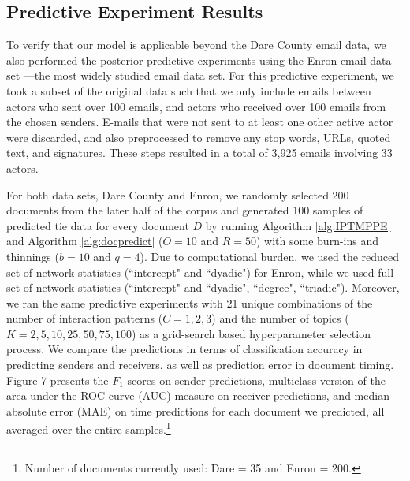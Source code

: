 \subsection{Predictive Experiment Results}
To verify that our model is applicable beyond the Dare County email data, we also performed the posterior predictive experiments using the Enron email data set ---the most widely studied email data set. For this predictive experiment, we took a subset of the original data such that we only include emails between actors who sent over 100 emails, and actors who received over 100 emails from the chosen senders. E-mails that were not sent to at least one other active actor were discarded, and also preprocessed to remove any stop words, URLs, quoted text, and signatures. These steps resulted in a total of 3,925 emails involving 33 actors. 

For both data sets, Dare County and Enron, we randomly selected 200 documents from the later half of the corpus and generated 100 samples of predicted tie data for every document $D$ by running Algorithm \ref{alg:IPTMPPE} and Algorithm \ref{alg:docpredict} ($O = 10$ and $R = 50$) with some burn-ins and thinnings ($b = 10$ and $q = 4$). Due to computational burden, we used the reduced set of network statistics (``intercept" and ``dyadic") for Enron, while we used full set of network statistics (``intercept" and ``dyadic", ``degree", ``triadic"). Moreover, we ran the same predictive experiments with 21 unique combinations of the number of interaction patterns ($C = 1, 2, 3$) and the number of topics ($K = 2, 5, 10, 25, 50, 75, 100$) as a grid-search based hyperparameter selection process. We compare the predictions in terms of classification accuracy in predicting senders and receivers, as well as prediction error in document timing. Figure 7 presents the $F_1$ scores on sender predictions, multiclass version of the area under the ROC curve (AUC) measure \citep{hand2001simple} on receiver predictions, and median absolute error (MAE) on time predictions for each document we predicted, all averaged over the entire samples.\footnote{\noindent Number of documents currently used: Dare = 35 and Enron = 200.}

